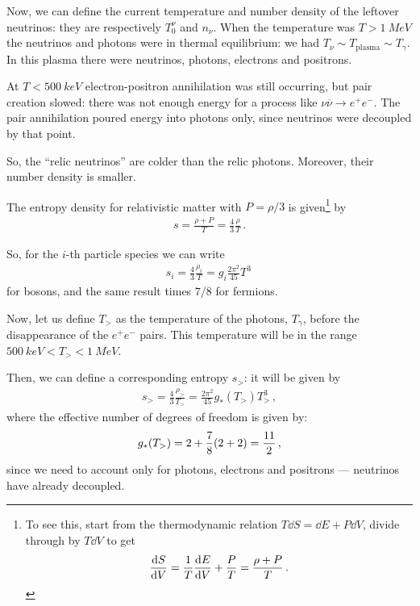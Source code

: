 \documentclass[main.tex]{subfiles}
\begin{document}
Now, we can define the current temperature and number density of the leftover neutrinos: they are respectively \(T^{\nu }_{0}\) and \(n_\nu \).
When the temperature was \(T > \SI{1}{MeV}\) the neutrinos and photons were in thermal equilibrium: we had \(T_\nu \sim T _{\text{plasma}} \sim T_\gamma \). In this plasma there were neutrinos, photons, electrons and positrons.

At \(T < \SI{500}{keV}\) electron-positron annihilation was still occurring, but pair creation slowed: there was not enough energy for a process like \(\nu \overline{\nu} \to e^{+}e^{-}\).
The pair annihilation poured energy into photons only, since neutrinos were decoupled by that point. 

So, the ``relic neutrinos'' are colder than the relic photons. Moreover, their number density is smaller. 

The entropy density for relativistic matter with \(P = \rho / 3\) is given\footnote{To see this, start from the thermodynamic relation \(T \dd{S} = \dd{E } + P \dd{V} \), divide through by \(T \dd{V}\) to get 
%
\begin{align}
\dv{S}{V} = \frac{1}{T}\dv{E}{V} + \frac{P}{T} = \frac{\rho + P}{T}
\,.
\end{align}
%
} by 
%
\begin{align}
s = \frac{\rho + P}{T} = \frac{4}{3} \frac{\rho}{T}
\,.
\end{align}

So, for the \(i\)-th particle species we can write 
%
\begin{align}
s_i = \frac{4}{3} \frac{\rho_{i}}{T}
= g_i \frac{2 \pi^2}{45} T^3
\,
\end{align}
%
for bosons, and the same result times \(7/8\) for fermions. 

Now, let us define \(T_{>}\) as the temperature of the photons, \(T_\gamma \), before the disappearance of the \(e^{+}e^{-}\) pairs. This temperature will be in the range \(\SI{500}{keV} < T_> < \SI{1}{MeV}\). 

Then, we can define a corresponding entropy \(s_>\): it will be given by 
%
\begin{align}
s_> = \frac{4}{3} \frac{\rho_{>}}{T_>} = \frac{2 \pi^2}{45} g_* (T_>) T^3_> 
\,,
\end{align}
%
where the effective number of degrees of freedom is given by:
%
\begin{align}
g_* (T_>) = 2 + \frac{7}{8} \qty(2 + 2) = \frac{11}{2}
\,,
\end{align}
%
since we need to account only for photons, electrons and positrons --- neutrinos have already decoupled. 
\end{document}
